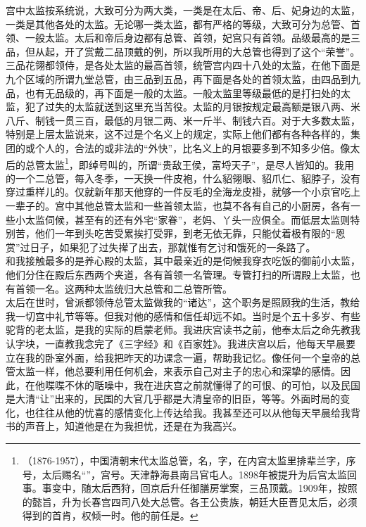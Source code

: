 宫中太监按系统说，大致可分为两大类，一类是在太后、帝、后、妃身边的太监，一类是其他各处的太监。无论哪一类太监，都有严格的等级，大致可分为总管、首领、一般太监。太后和帝后身边都有总管、首领，妃宫只有首领。品级最高的是三品，但从起，开了赏戴二品顶戴的例，所以我所用的大总管也得到了这个“荣誉”。三品花翎都领侍，是各处太监的最高首领，统管宫内四十八处的太监，在他下面是九个区域的所谓九堂总管，由三品到五品，再下面是各处的首领太监，由四品到九品，也有无品级的，再下面是一般的太监。一般太监里等级最低的是打扫处的太监，犯了过失的太监就送到这里充当苦役。太监的月银按规定最高额是银八两、米八斤、制钱一贯三百，最低的月银二两、米一斤半、制钱六百。对于大多数太监，特别是上层太监说来，这不过是个名义上的规定，实际上他们都有各种各样的，集团的或个人的，合法的或非法的“外快”，比名义上的月银要多到不知多少倍。像太后的总管太监\footnote{（1876-1957），中国清朝末代太监总管，名，字，在内宫太监里排辈兰字，序号，太后赐名“”，宫号。天津静海县南吕官屯人。1898年被提升为后宫太监回事。事变中，随太后西狩，回京后升任御膳房掌案，三品顶戴。1909年，按照的懿旨，升为长春宫四司八处大总管。各王公贵族，朝廷大臣晋见太后，必须得到的首肯，权倾一时。他的前任是。}，即绰号叫的，所谓“贵敌王侯，富埒天子”，是尽人皆知的。我用的一个二总管，每入冬季，一天换一件皮袍，什么貂翎眼、貂爪仁、貂脖子，没有穿过重样儿的。仅就新年那天他穿的一件反毛的全海龙皮褂，就够一个小京官吃上一辈子的。宫中其他总管太监和一些首领太监，也莫不各有自己的小厨房，各有一些小太监伺候，甚至有的还有外宅“家眷”，老妈、丫头一应俱全。而低层太监则特别苦，他们一年到头吃苦受累挨打受罪，到老无依无靠，只能仗着极有限的“恩赏”过日子，如果犯了过失撵了出去，那就惟有乞讨和饿死的一条路了。\\

和我接触最多的是养心殿的太监，其中最亲近的是伺候我穿衣吃饭的御前小太监，他们分住在殿后东西两个夹道，各有首领一名管理。专管打扫的所谓殿上太监，也有首领一名。这两种太监统归大总管和二总管所管。\\

太后在世时，曾派都领侍总管太监做我的“诸达”，这个职务是照顾我的生活，教给我一切宫中礼节等等。但我对他的感情和信任却远不如。当时是个五十多岁、有些驼背的老太监，是我的实际的启蒙老师。我进庆宫读书之前，他奉太后之命先教我认字块，一直教我念完了《三字经》和《百家姓》。我进庆宫以后，他每天早晨要立在我的卧室外面，给我把昨天的功课念一遍，帮助我记忆。像任何一个皇帝的总管太监一样，他总要利用任何机会，来表示自己对主子的忠心和深挚的感情。因此，在他喋喋不休的聒噪中，我在进庆宫之前就懂得了的可恨、的可怕，以及民国是大清“让”出来的，民国的大官几乎都是大清皇帝的旧臣，等等。外面时局的变化，也往往从他的忧喜的感情变化上传达给我。我甚至还可以从他每天早晨给我背书的声音上，知道他是在为我担忧，还是在为我高兴。\\

